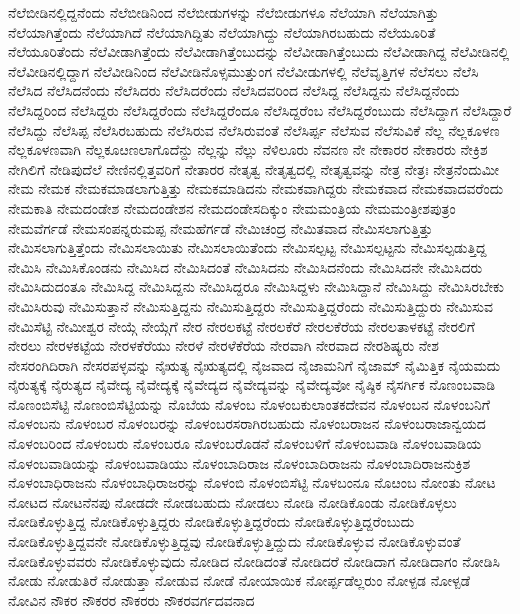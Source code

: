 {ನೆಲೆಬೀಡಿನಲ್ಲಿದ್ದನೆಂದು
ನೆಲೆಬೀಡಿನಿಂದ
ನೆಲೆಬೀಡುಗಳನ್ನು
ನೆಲೆಬೀಡುಗಳೂ
ನೆಲೆಯಾಗಿ
ನೆಲೆಯಾಗಿತ್ತು
ನೆಲೆಯಾಗಿತ್ತೆಂದು
ನೆಲೆಯಾಗಿದೆ
ನೆಲೆಯಾಗಿದ್ದಿತು
ನೆಲೆಯಾಗಿದ್ದು
ನೆಲೆಯಾಗಿರಬಹುದು
ನೆಲೆಯೂರಿತೆ
ನೆಲೆಯೂರಿತೆಂದು
ನೆಲೆವೀಡಾಗಿತ್ತೆಂದು
ನೆಲೆವೀಡಾಗಿತ್ತೆಂಬುದನ್ನು
ನೆಲೆವೀಡಾಗಿತ್ತೆಂಬುದು
ನೆಲೆವೀಡಾಗಿದ್ದ
ನೆಲೆವೀಡಿನಲ್ಲಿ
ನೆಲೆವೀಡಿನಲ್ಲಿದ್ದಾಗ
ನೆಲೆವೀಡಿನಿಂದ
ನೆಲೆವೀಡಿನೊಳ್ಸಮುತ್ತುಂಗ
ನೆಲೆವೀಡುಗಳಲ್ಲಿ
ನೆಲೆವೃತ್ತಿಗಳ
ನೆಲೆಸಲು
ನೆಲೆಸಿ
ನೆಲೆಸಿದ
ನೆಲೆಸಿದನೆಂದು
ನೆಲೆಸಿದರು
ನೆಲೆಸಿದರೆಂದು
ನೆಲೆಸಿದವರಿಂದ
ನೆಲೆಸಿದ್ದ
ನೆಲೆಸಿದ್ದನು
ನೆಲೆಸಿದ್ದನೆಂದು
ನೆಲೆಸಿದ್ದರಿಂದ
ನೆಲೆಸಿದ್ದರು
ನೆಲೆಸಿದ್ದರೆಂದು
ನೆಲೆಸಿದ್ದರೆಂದೂ
ನೆಲೆಸಿದ್ದರೆಂಬ
ನೆಲೆಸಿದ್ದರೆಂಬುದು
ನೆಲೆಸಿದ್ದಾಗ
ನೆಲೆಸಿದ್ದಾರೆ
ನೆಲೆಸಿದ್ದು
ನೆಲೆಸಿಪ್ಪ
ನೆಲೆಸಿರಬಹುದು
ನೆಲೆಸಿರುವ
ನೆಲೆಸಿರುವಂತೆ
ನೆಲೆಸಿರ್ಪ್ಪ
ನೆಲೆಸುವ
ನೆಲೆಸುವಿಕೆ
ನೆಲ್ಲ
ನೆಲ್ಲಕೂಳಣ
ನೆಲ್ಲಕೂಳಣವಾಗಿ
ನೆಲ್ಲಕೂೞಣಲಾಗೊದೆನ್ದು
ನೆಲ್ಲನ್ನು
ನೆಲ್ಲು
ನೆಳಿಲೂರು
ನೆವನಣ
ನೇ
ನೇಕಾರರ
ನೇಕಾರರು
ನೇಕ್ರಿಶ
ನೇಗಿಲಿಗೆ
ನೇಡಿಪುದೆಲೆ
ನೇಣಿನಲ್ಲಿತ್ತವರಿಗೆ
ನೇತಾರರ
ನೇತೃತ್ವ
ನೇತೃತ್ವದಲ್ಲಿ
ನೇತೃತ್ವವನ್ನು
ನೇತ್ರ
ನೇತ್ರಃ
ನೇತ್ರನೆಂದುಮೀ
ನೇಮ
ನೇಮಕ
ನೇಮಕಮಾಡಲಾಗುತ್ತಿತ್ತು
ನೇಮಕಮಾಡಿದನು
ನೇಮಕವಾಗಿದ್ದರು
ನೇಮಕವಾದ
ನೇಮಕವಾದವರೆಂದು
ನೇಮಕಾತಿ
ನೇಮದಂಡೇಶ
ನೇಮದಂಡೇಶನ
ನೇಮದಂಡೇಸದಿಕ್ಕುಂ
ನೇಮಮಂತ್ರಿಯ
ನೇಮಮಂತ್ರೀಶಪುತ್ರಂ
ನೇಮವೆರ್ಗಡೆ
ನೇಮಸಂಪನ್ನರುಮಪ್ಪ
ನೇಮಹೆರ್ಗಡೆ
ನೇಮಿಚಂದ್ರ
ನೇಮಿತವಾದ
ನೇಮಿಸಲಾಗುತ್ತಿತ್ತು
ನೇಮಿಸಲಾಗುತ್ತಿತ್ತೆಂದು
ನೇಮಿಸಲಾಯಿತು
ನೇಮಿಸಲಾಯಿತೆಂದು
ನೇಮಿಸಲ್ಪಟ್ಟ
ನೇಮಿಸಲ್ಪಟ್ಟನು
ನೇಮಿಸಲ್ಪಡುತ್ತಿದ್ದ
ನೇಮಿಸಿ
ನೇಮಿಸಿಕೊಂಡನು
ನೇಮಿಸಿದ
ನೇಮಿಸಿದಂತೆ
ನೇಮಿಸಿದನು
ನೇಮಿಸಿದನೆಂದು
ನೇಮಿಸಿದನೇ
ನೇಮಿಸಿದರು
ನೇಮಿಸಿದುದಂತೂ
ನೇಮಿಸಿದ್ದ
ನೇಮಿಸಿದ್ದನು
ನೇಮಿಸಿದ್ದರೂ
ನೇಮಿಸಿದ್ದಳು
ನೇಮಿಸಿದ್ದಾನೆ
ನೇಮಿಸಿದ್ದು
ನೇಮಿಸಿರಬೇಕು
ನೇಮಿಸಿರುವು
ನೇಮಿಸುತ್ತಾನೆ
ನೇಮಿಸುತ್ತಿದ್ದನು
ನೇಮಿಸುತ್ತಿದ್ದರು
ನೇಮಿಸುತ್ತಿದ್ದರೆಂದು
ನೇಮಿಸುತ್ತಿದ್ದುರು
ನೇಮಿಸುವ
ನೇಮಿಸೆಟ್ಟಿ
ನೇಮೀಶ್ವರ
ನೇಯ್ಗೆ
ನೇಯ್ಗೆಗೆ
ನೇರ
ನೇರಲಕಟ್ಟೆ
ನೇರಲಕೆರೆ
ನೇರಲಕೆರೆಯ
ನೇರಲತಾಳಕಟ್ಟೆ
ನೇರಲಿಗೆ
ನೇರಲು
ನೇರಳಕಟ್ಟೆಯ
ನೇರಳಕೆರೆಯು
ನೇರಳೆ
ನೇರಳೆಕೆರೆಯ
ನೇರವಾಗಿ
ನೇರವಾದ
ನೇರಶಿಷ್ಯರು
ನೇಶ
ನೇಸರಂಗಿದಿರಾಗಿ
ನೇಸರಪಳ್ಳವನ್ನು
ನೈಋತ್ಯ
ನೈಋತ್ಯದಲ್ಲಿ
ನೈಜವಾದ
ನೈಜಾಮನಿಗೆ
ನೈಜಾಮ್
ನೈಮಿತ್ತಿಕ
ನೈಯಮದು
ನೈರುತ್ಯಕ್ಕೆ
ನೈರುತ್ಯದ
ನೈವೇದ್ಯ
ನೈವೇದ್ಯಕ್ಕೆ
ನೈವೇದ್ಯದ
ನೈವೇದ್ಯವನ್ನು
ನೈವೇದ್ಯವೋ
ನೈಷ್ಠಿಕ
ನೈಸರ್ಗಿಕ
ನೊಣಂಬವಾಡಿ
ನೊಣಂಬಿಸೆಟ್ಟಿ
ನೊಣಂಬಿಸೆಟ್ಟಿಯನ್ನು
ನೊಬೆಯ
ನೊಳಂಬ
ನೊಳಂಬಕುಲಾಂತಕದೇವನ
ನೊಳಂಬನ
ನೊಳಂಬನಿಗೆ
ನೊಳಂಬನು
ನೊಳಂಬರ
ನೊಳಂಬರನ್ನು
ನೊಳಂಬರಸರಾಗಿರಬಹುದು
ನೊಳಂಬರಾಜನ
ನೊಳಂಬರಾಜಾನ್ವಯದ
ನೊಳಂಬರಿಂದ
ನೊಳಂಬರು
ನೊಳಂಬರೂ
ನೊಳಂಬರೊಡನೆ
ನೊಳಂಬಳಿಗೆ
ನೊಳಂಬವಾಡಿ
ನೊಳಂಬವಾಡಿಯ
ನೊಳಂಬವಾಡಿಯನ್ನು
ನೊಳಂಬವಾಡಿಯು
ನೊಳಂಬಾದಿರಾಜ
ನೊಳಂಬಾದಿರಾಜನು
ನೊಳಂಬಾದಿರಾಜನುಕ್ರಿಶ
ನೊಳಂಬಾಧಿರಾಜನು
ನೊಳಂಬಾಧಿರಾಜರನ್ನು
ನೊಳಂಬಿ
ನೊಳಂಬಿಸೆಟ್ಟಿ
ನೊಳಬಂನೂ
ನೊೞಂಬ
ನೋಂತು
ನೋಟ
ನೋಟದ
ನೋಟನೆನಪು
ನೋಡದೇ
ನೋಡಬಹುದು
ನೋಡಲು
ನೋಡಿ
ನೋಡಿಕೊಂಡು
ನೋಡಿಕೊಳ್ಳಲು
ನೋಡಿಕೊಳ್ಳುತ್ತಿದ್ದ
ನೋಡಿಕೊಳ್ಳುತ್ತಿದ್ದರು
ನೋಡಿಕೊಳ್ಳುತ್ತಿದ್ದರೆಂದು
ನೋಡಿಕೊಳ್ಳುತ್ತಿದ್ದರೆಂಬುದು
ನೋಡಿಕೊಳ್ಳುತ್ತಿದ್ದವನೇ
ನೋಡಿಕೊಳ್ಳುತ್ತಿದ್ದವು
ನೋಡಿಕೊಳ್ಳುತ್ತಿದ್ದುದು
ನೋಡಿಕೊಳ್ಳುವ
ನೋಡಿಕೊಳ್ಳುವಂತೆ
ನೋಡಿಕೊಳ್ಳುವವರು
ನೋಡಿಕೊಳ್ಳುವುದು
ನೋಡಿದ
ನೋಡಿದಂತೆ
ನೋಡಿದರೆ
ನೋಡಿದಾಗ
ನೋಡಿದಾಗಂ
ನೋಡಿಸಿ
ನೋಡು
ನೋಡುತಿರೆ
ನೋಡುತ್ತಾ
ನೋಡುವ
ನೋಡೆ
ನೋಯಾಯಿಕ
ನೋರ್ಪ್ಪಡೆಲ್ಲರುಂ
ನೋಳ್ಪಡ
ನೋಳ್ಪಡೆ
ನೋವಿನ
ನೌಕರ
ನೌಕರರ
ನೌಕರರು
ನೌಕರವರ್ಗದವನಾದ
}
